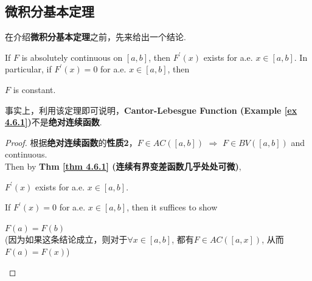 \subsection{微积分基本定理}
	在介绍\textbf{微积分基本定理}之前，先来给出一个结论.
	\begin{thm}\label{thm 4.7.3}
		If $F$ is absolutely continuous on $[a , b]$, then $F^{'}(x)$ exists for a.e. $x \in [a , b]$. In particular, if $F^{'}(x) = 0$ for a.e. $x \in [a , b]$, then
		\begin{center}
			$F$ is constant.
		\end{center}
		
		\vspace{2em}
		\begin{rmk}
			事实上，利用该定理即可说明，\textbf{Cantor-Lebesgue Function (Example \ref{ex 4.6.1})}不是\textbf{绝对连续函数}.
		\end{rmk}
		
		\vspace{2em}
		\begin{proof}
			根据\textbf{绝对连续函数}的\textbf{性质2}，$F \in AC([a , b]) \,\, \Rightarrow \,\, F \in BV([a , b])$ and continuous. \\
			Then by \textbf{Thm \ref{thm 4.6.1} (连续有界变差函数几乎处处可微)},
			\begin{center}
				$F^{'}(x)$ exists for a.e. $x \in [a , b]$.
			\end{center}
			
			\vspace{1em}
			If $F^{'}(x) = 0$ for a.e. $x \in [a , b]$, then it suffices to show 
			\begin{center}
				$F(a) = F(b)$ \\
				(因为如果这条结论成立，则对于$\forall x \in [a , b]$, 都有$F \in AC([a , x])$, 从而$F(a) = F(x)$)
			\end{center}
			

\end{proof}
\end{thm}
